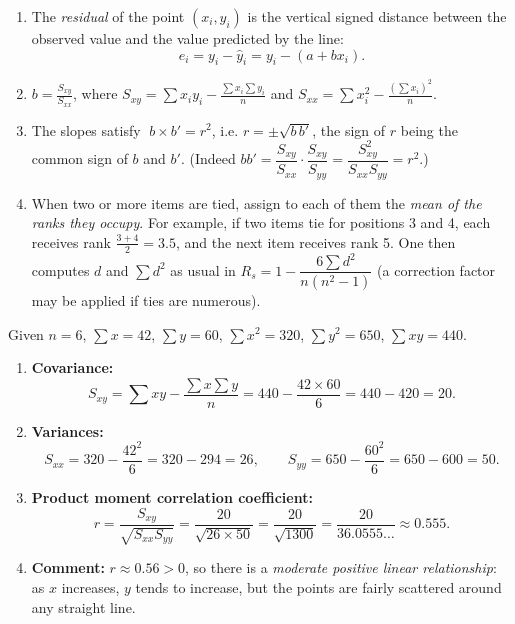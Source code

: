 \documentclass[11pt]{article}
\begin{document}
\begin{corrige}
\begin{enumerate}
\item The \emph{residual} of the point $(x_i, y_i)$ is the vertical signed distance between the observed value and the value predicted by the line:
\[
e_i = y_i - \hat{y}_i = y_i - (a + bx_i).
\]
\item $\displaystyle b = \frac{S_{xy}}{S_{xx}}$, where $S_{xy} = \sum x_iy_i - \frac{\sum x_i \sum y_i}{n}$ and $S_{xx} = \sum x_i^2 - \frac{(\sum x_i)^2}{n}$.
\item The slopes satisfy $\;b \times b' = r^2$, i.e. $r = \pm\sqrt{b\,b'}$, the sign of $r$ being the common sign of $b$ and $b'$. (Indeed $bb' = \dfrac{S_{xy}}{S_{xx}}\cdot\dfrac{S_{xy}}{S_{yy}} = \dfrac{S_{xy}^2}{S_{xx}S_{yy}} = r^2$.)
\item When two or more items are tied, assign to each of them the \emph{mean of the ranks they occupy}. For example, if two items tie for positions 3 and 4, each receives rank $\frac{3+4}{2} = 3.5$, and the next item receives rank 5. One then computes $d$ and $\sum d^2$ as usual in $R_s = 1 - \dfrac{6\sum d^2}{n(n^2-1)}$ (a correction factor may be applied if ties are numerous).
\end{enumerate}
\end{corrige}

\begin{corrige}
Given $n = 6$, $\sum x = 42$, $\sum y = 60$, $\sum x^2 = 320$, $\sum y^2 = 650$, $\sum xy = 440$.
\begin{enumerate}
\item \textbf{Covariance:}
\[
S_{xy} = \sum xy - \frac{\sum x \sum y}{n} = 440 - \frac{42 \times 60}{6} = 440 - 420 = \boxed{20}.
\]
\item \textbf{Variances:}
\[
S_{xx} = 320 - \frac{42^2}{6} = 320 - 294 = \boxed{26}, \qquad
S_{yy} = 650 - \frac{60^2}{6} = 650 - 600 = \boxed{50}.
\]
\item \textbf{Product moment correlation coefficient:}
\[
r = \frac{S_{xy}}{\sqrt{S_{xx}S_{yy}}} = \frac{20}{\sqrt{26 \times 50}} = \frac{20}{\sqrt{1300}} = \frac{20}{36.0555\ldots} \approx \boxed{0.555}.
\]
\item \textbf{Comment:} $r \approx 0.56 > 0$, so there is a \emph{moderate positive linear relationship}: as $x$ increases, $y$ tends to increase, but the points are fairly scattered around any straight line.
\end{enumerate}
\end{corrige}
\end{document}

